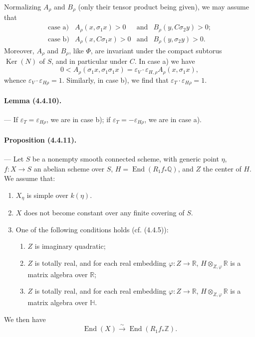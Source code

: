 \documentclass[10pt]{article}
\newcommand{\Q}{\mathbb Q}
\newcommand{\Z}{\mathbb Z}
\newcommand{\Ker}{\operatorname{Ker}}
\newcommand{\iso}{\xrightarrow{\sim}}
\newcommand{\R}{\mathbb R}
\providecommand{\End}{\operatorname{End}}
\begin{document}

Normalizing $A_\rho$ and $B_\rho$ (only their tensor product being given), we may assume that
\[
\begin{array}{llll}
\text{case a)}& A_\rho(x,\sigma_1x)>0 & \text{and} & B_\rho(y,C\sigma_2y)>0;\\[0.3em]
\text{case b)}& A_\rho(x,C\sigma_1x)>0 & \text{and} & B_\rho(y,\sigma_2y)>0.
\end{array}
\]
Moreover, $A_\rho$ and $B_\rho$, like $\Phi$, are invariant under the compact subtorus $\Ker(N)$ of $S$, and in particular under $C$. In case a) we have
\[
0<A_\rho(\sigma_1x,\sigma_1\sigma_1x)
=\varepsilon_V\cdot\varepsilon_{H,\rho} A_\rho(x,\sigma_1x),
\]
whence $\varepsilon_V\cdot\varepsilon_{H\rho}=1$. Similarly, in case b), we find that $\varepsilon_T\cdot\varepsilon_{H\rho}=1$.

\paragraph{Lemma (4.4.10).} --- If $\varepsilon_T=\varepsilon_{H\rho}$, we are in case b); if $\varepsilon_T=-\varepsilon_{H\rho}$, we are in case a).

\paragraph{Proposition (4.4.11).} --- Let $S$ be a nonempty smooth connected scheme, with generic point $\eta$, $f:X\to S$ an abelian scheme over $S$, $H=\End(R_1f_*\Q)$, and $Z$ the center of $H$. We assume that:
\begin{enumerate}[label=(\alph*)]
\item $X_\eta$ is simple over $k(\eta)$.
\item $X$ does not become constant over any finite covering of $S$.
\item One of the following conditions holds (cf. (4.4.5)):
\begin{enumerate}[label=(\ensuremath{c_{\arabic*}})]
\item $Z$ is imaginary quadratic;
\item $Z$ is totally real, and for each real embedding $\varphi:Z\to\R$, $H\otimes_{Z,\varphi}\R$ is a matrix algebra over $\R$;
\item $Z$ is totally real, and for each real embedding $\varphi:Z\to\R$, $H\otimes_{Z,\varphi}\R$ is a matrix algebra over $\mathbb H$.
\end{enumerate}
\end{enumerate}
We then have
\[
\End(X)\iso \End(R_1f_*\Z).
\]
\end{document}
